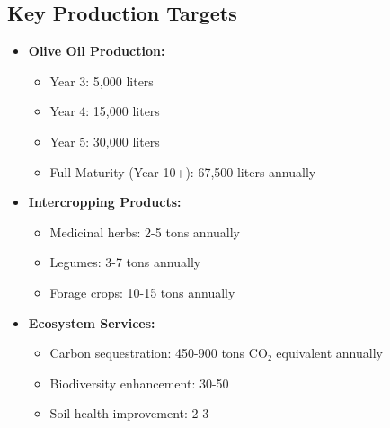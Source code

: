 \subsection{Key Production Targets}
\begin{itemize}
    \item \textbf{Olive Oil Production:}
    \begin{itemize}
        \item Year 3: 5,000 liters
        \item Year 4: 15,000 liters
        \item Year 5: 30,000 liters
        \item Full Maturity (Year 10+): 67,500 liters annually
    \end{itemize}
    
    \item \textbf{Intercropping Products:}
    \begin{itemize}
        \item Medicinal herbs: 2-5 tons annually
        \item Legumes: 3-7 tons annually
        \item Forage crops: 10-15 tons annually
    \end{itemize}
    
    \item \textbf{Ecosystem Services:}
    \begin{itemize}
        \item Carbon sequestration: 450-900 tons CO₂ equivalent annually
        \item Biodiversity enhancement: 30-50%
        \item Soil health improvement: 2-3%
    \end{itemize}
\end{itemize}

